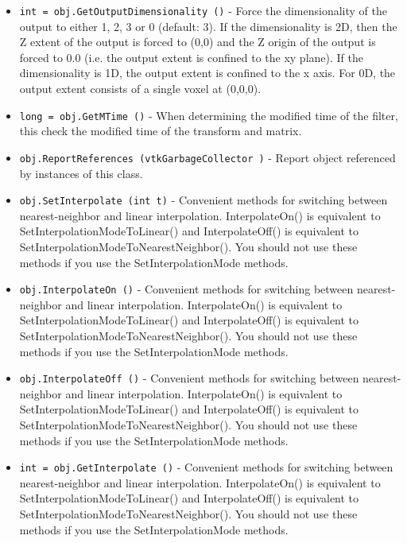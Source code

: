 \begin{itemize}
\item  \verb|int = obj.GetOutputDimensionality ()| -  Force the dimensionality of the output to either 1, 2,
 3 or 0 (default: 3).  If the dimensionality is 2D, then
 the Z extent of the output is forced to (0,0) and the Z
 origin of the output is forced to 0.0 (i.e. the output
 extent is confined to the xy plane).  If the dimensionality
 is 1D, the output extent is confined to the x axis.  
 For 0D, the output extent consists of a single voxel at 
 (0,0,0).

\item  \verb|long = obj.GetMTime ()| -  When determining the modified time of the filter, 
 this check the modified time of the transform and matrix.

\item  \verb|obj.ReportReferences (vtkGarbageCollector )| -  Report object referenced by instances of this class.

\item  \verb|obj.SetInterpolate (int t)| -  Convenient methods for switching between nearest-neighbor and linear
 interpolation.  
 InterpolateOn() is equivalent to SetInterpolationModeToLinear() and
 InterpolateOff() is equivalent to SetInterpolationModeToNearestNeighbor().
 You should not use these methods if you use the SetInterpolationMode
 methods.

\item  \verb|obj.InterpolateOn ()| -  Convenient methods for switching between nearest-neighbor and linear
 interpolation.  
 InterpolateOn() is equivalent to SetInterpolationModeToLinear() and
 InterpolateOff() is equivalent to SetInterpolationModeToNearestNeighbor().
 You should not use these methods if you use the SetInterpolationMode
 methods.

\item  \verb|obj.InterpolateOff ()| -  Convenient methods for switching between nearest-neighbor and linear
 interpolation.  
 InterpolateOn() is equivalent to SetInterpolationModeToLinear() and
 InterpolateOff() is equivalent to SetInterpolationModeToNearestNeighbor().
 You should not use these methods if you use the SetInterpolationMode
 methods.

\item  \verb|int = obj.GetInterpolate ()| -  Convenient methods for switching between nearest-neighbor and linear
 interpolation.  
 InterpolateOn() is equivalent to SetInterpolationModeToLinear() and
 InterpolateOff() is equivalent to SetInterpolationModeToNearestNeighbor().
 You should not use these methods if you use the SetInterpolationMode
 methods.


\end{itemize}
